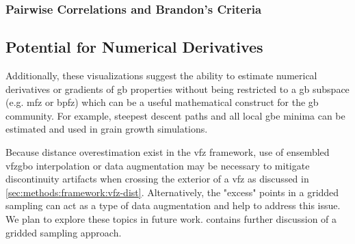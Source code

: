 \documentclass[final,twocolumn,12pt]{elsarticle}
\begin{document}
    \subsubsection{Pairwise Correlations and Brandon's Criteria} \label{sec:discuss:correlation:pairwise}
    
	 \subsection{Potential for Numerical Derivatives}
	\label{sec:discuss:deriv}
	
	Additionally, these visualizations suggest the ability to estimate numerical derivatives or gradients of \gls{gb} properties without being restricted to a \gls{gb} subspace (e.g. \gls{mfz} or \gls{bpfz}) which can be a useful mathematical construct for the \gls{gb} community. For example, steepest descent paths and all local \gls{gbe} minima can be estimated and used in grain growth simulations.
	
	Because distance overestimation exist in the \gls{vfz} framework, use of ensembled \gls{vfzgbo} interpolation or data augmentation may be necessary to mitigate discontinuity artifacts when crossing the exterior of a \gls{vfz} as discussed in \cref{sec:methods:framework:vfz-dist}. Alternatively, the "excess" points in a gridded sampling can act as a type of data augmentation and help to address this issue. We plan to explore these topics in future work.  contains further discussion of a gridded sampling approach.
	
\end{document}
